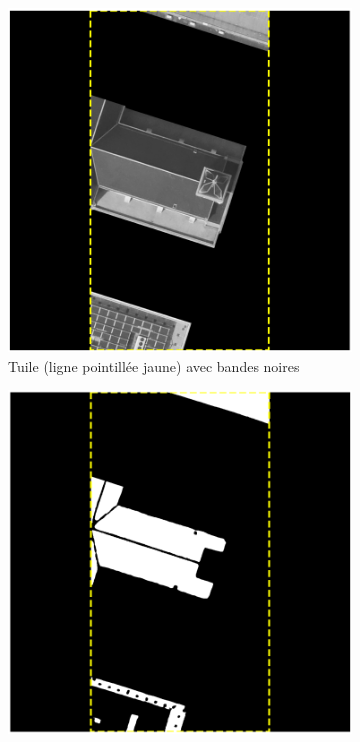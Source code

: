 \begin{figure}[H]
    \centering
    \begin{subfigure}[b]{0.49\textwidth}
        \centering
        \includegraphics[width=\textwidth]{02-main/figures/ch3/ch3_postprocessing_dataset_16_verification_taille1.png}
        \caption{Tuile (ligne pointillée jaune) avec bandes noires}
        \label{fig:ch3_postprocessing_dataset_16_verification_taille1}
    \end{subfigure}
    \hfill
    \begin{subfigure}[b]{0.49\textwidth}
        \centering
        \includegraphics[width=\textwidth]{02-main/figures/ch3/ch3_postprocessing_dataset_17_verification_taille2.png}

\end{subfigure}
\end{figure}
